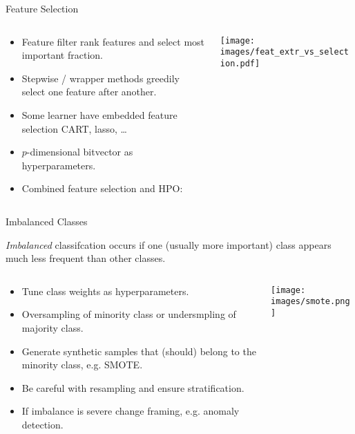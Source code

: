 	\begin{frame}{Feature Selection}
		\begin{columns}
			\begin{column}{0.6\textwidth}
				\begin{itemize}
					
					\item Feature filter rank features and select most important fraction.
					\item Stepwise / wrapper methods greedily select one feature after another. 
					\item Some learner have embedded feature selection CART, lasso, \ldots 
					\item $p$-dimensional bitvector as hyperparameters.
					\item Combined feature selection and HPO: 
					
				\end{itemize}
			\end{column}%
			\begin{column}{0.4\textwidth}
				\begin{center}
					\texttt{[image: images/feat\_extr\_vs\_selection.pdf]}%
					\end{center}
			\end{column}
		\end{columns}
		
	\end{frame}
	

	
	
	\begin{frame}{Imbalanced Classes}
	
		\textit{Imbalanced} classifcation occurs if one (usually more important) class appears much less frequent than other classes.

		\begin{columns}
			\begin{column}{0.4\textwidth}
				\begin{itemize}
					\item Tune class weights as hyperparameters.
					\item Oversampling of minority class or undersmpling of majority class.
					\item Generate synthetic samples that (should) belong to the minority class, e.g. SMOTE.
					\item Be careful with resampling and ensure stratification.
					\item If imbalance is severe change framing, e.g. anomaly detection.
				\end{itemize}
			\end{column}%
			\begin{column}{0.6\textwidth}
				\begin{center}
					\texttt{[image: images/smote.png]}
					\end{center}
			\end{column}
		\end{columns}
	\end{frame}
	
	
	

